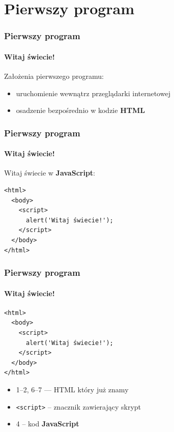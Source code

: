 \section{Pierwszy program}

\begin{frame}[fragile]
  \frametitle{Pierwszy program}
  \framesubtitle{Witaj świecie!}

  Założenia pierwszego programu:

  \begin{itemize}
    \item uruchomienie wewnątrz przeglądarki internetowej
    \item osadzenie bezpośrednio w kodzie \textbf{HTML}
  \end{itemize}

\end{frame}


\begin{frame}[fragile]
  \frametitle{Pierwszy program}
  \framesubtitle{Witaj świecie!}

  Witaj świecie w \textbf{JavaScript}:

  \begin{verbatim}
<html>
  <body>
    <script>
      alert('Witaj świecie!');
    </script>
  </body>
</html>
  \end{verbatim}

\end{frame}


\begin{frame}[fragile]
  \frametitle{Pierwszy program}
  \framesubtitle{Witaj świecie!}

  \begin{verbatim}
<html>
  <body>
    <script>
      alert('Witaj świecie!');
    </script>
  </body>
</html>
  \end{verbatim}

  \begin{itemize}
    \item 1--2, 6--7 --- HTML który już znamy
    \item \verb|<script>| -- znacznik zawierający skrypt
    \item 4 -- kod \textbf{JavaScript}
  \end{itemize}

\end{frame}



